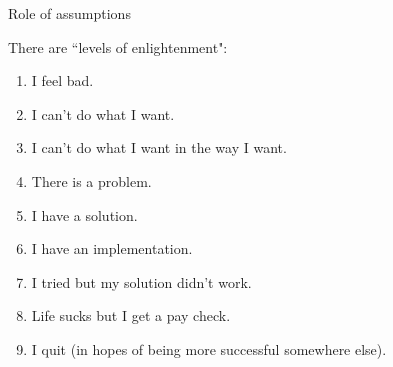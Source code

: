 Role of assumptions 


There are ``levels of enlightenment":
\begin{enumerate}
    \item I feel bad.
    \item I can't do what I want.
    \item I can't do what I want in the way I want.
    \item There is a problem.
    \item I have a solution.
    \item I have an implementation.
    \item I tried but my solution didn't work.
    \item Life sucks but I get a pay check.
    \item I quit (in hopes of being more successful somewhere else).
\end{enumerate}
